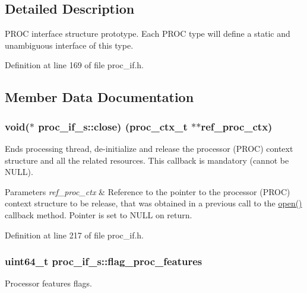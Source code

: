 \subsection{Detailed Description}
P\+R\+OC interface structure prototype. Each P\+R\+OC type will define a static and unambiguous interface of this type. 

Definition at line 169 of file proc\+\_\+if.\+h.



\subsection{Member Data Documentation}
\subsubsection[{\texorpdfstring{close}{close}}]{\setlength{\rightskip}{0pt plus 5cm}void($\ast$ proc\+\_\+if\+\_\+s\+::close) ({\bf proc\+\_\+ctx\+\_\+t} $\ast$$\ast$ref\+\_\+proc\+\_\+ctx)}\hypertarget{structproc__if__s_af5971ac1d09d1c6ec3508c36fb286c19}{}\label{structproc__if__s_af5971ac1d09d1c6ec3508c36fb286c19}
Ends processing thread, de-\/initialize and release the processor (P\+R\+OC) context structure and all the related resources. This callback is mandatory (cannot be N\+U\+LL). 
\begin{DoxyParams}{Parameters}
{\em ref\+\_\+proc\+\_\+ctx} & Reference to the pointer to the processor (P\+R\+OC) context structure to be release, that was obtained in a previous call to the \textquotesingle{}\hyperlink{structproc__if__s_a34999576771394dfb721463c8455ba06}{open()}\textquotesingle{} callback method. Pointer is set to N\+U\+LL on return. \\
\hline
\end{DoxyParams}


Definition at line 217 of file proc\+\_\+if.\+h.

\subsubsection[{\texorpdfstring{flag\+\_\+proc\+\_\+features}{flag_proc_features}}]{\setlength{\rightskip}{0pt plus 5cm}uint64\+\_\+t proc\+\_\+if\+\_\+s\+::flag\+\_\+proc\+\_\+features}\hypertarget{structproc__if__s_a657d976a32c34bff11070599b11c2dd7}{}\label{structproc__if__s_a657d976a32c34bff11070599b11c2dd7}
Processor features flags. 

